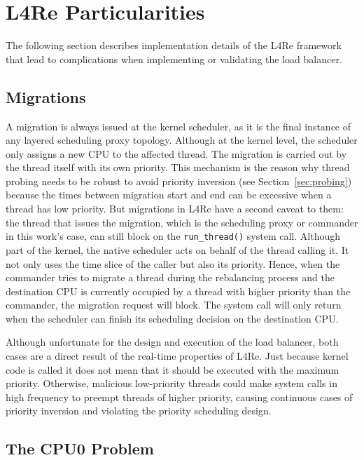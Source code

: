 \section{L4Re Particularities}
\label{sec:l4re-particularities}

The following section describes implementation details of the L4Re framework that lead to complications when implementing or validating the load balancer.

\subsection{Migrations}

A migration is always issued at the kernel scheduler, as it is the final instance of any layered scheduling proxy topology.
Although at the kernel level, the scheduler only assigns a new CPU to the affected thread.
The migration is carried out by the thread itself with its own priority.
This mechanism is the reason why thread probing needs to be robust to avoid priority inversion (see Section~\ref{sec:probing}) because the times between migration start and end can be excessive when a thread has low priority.
But migrations in L4Re have a second caveat to them: the thread that issues the migration, which is the scheduling proxy or commander in this work's case, can still block on the \texttt{run\_thread()} system call.
Although part of the kernel, the native scheduler acts on behalf of the thread calling it.
It not only uses the time slice of the caller but also its priority.
Hence, when the commander tries to migrate a thread during the rebalancing process and the destination CPU is currently occupied by a thread with higher priority than the commander, the migration request will block.
The system call will only return when the scheduler can finish its scheduling decision on the destination CPU.

Although unfortunate for the design and execution of the load balancer, both cases are a direct result of the real-time properties of L4Re.
Just because kernel code is called it does not mean that it should be executed with the maximum priority.
Otherwise, malicious low-priority threads could make system calls in high frequency to preempt threads of higher priority, causing continuous cases of priority inversion and violating the priority scheduling design.

\subsection{The CPU0 Problem}
\label{sec:cpu0-problem}

